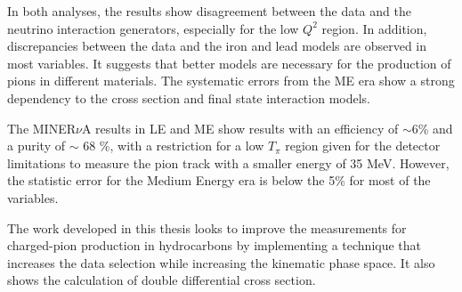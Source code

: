 In both analyses, the results show disagreement between the data and the neutrino interaction generators, especially for the low $Q^2$ region. In addition, discrepancies between the data and the iron and lead models are observed in most variables. It suggests that better models are necessary for the production of pions in different materials. The systematic errors from the ME era show a strong dependency to the cross section and final state interaction models.  

The MINER$\nu$A results in LE and ME show results with an efficiency of $\sim$6\% and a purity of $\sim$ 68 \%, with a restriction for a low $T_\pi$ region given for the detector limitations to measure the pion track with a smaller energy of 35 MeV. However, the statistic error for the Medium Energy era is below the 5\% for most of the variables.  

The work developed in this thesis looks to improve the measurements for charged-pion production in hydrocarbons by implementing a technique that increases the data selection while increasing the kinematic phase space. It also shows the calculation of double differential cross section. 